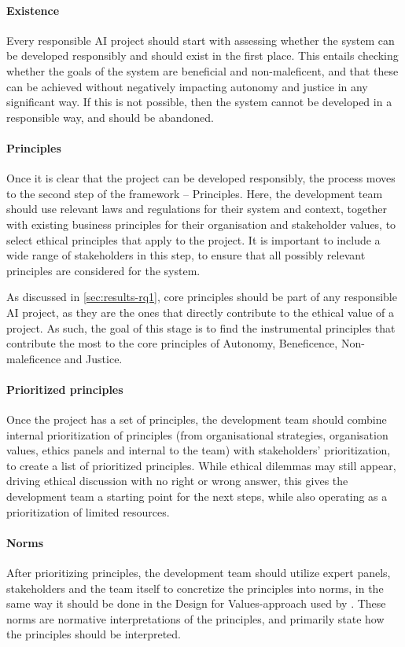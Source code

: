 \paragraph{Existence}
Every responsible AI project should start with assessing whether the system can be developed responsibly and should exist in the first place. This entails checking whether the goals of the system are beneficial and non-maleficent, and that these can be achieved without negatively impacting autonomy and justice in any significant way. If this is not possible, then the system cannot be developed in a responsible way, and should be abandoned.

\paragraph{Principles}
Once it is clear that the project can be developed responsibly, the process moves to the second step of the framework -- Principles. Here, the development team should use relevant laws and regulations for their system and context, together with existing business principles for their organisation and stakeholder values, to select ethical principles that apply to the project. It is important to include a wide range of stakeholders in this step, to ensure that all possibly relevant principles are considered for the system.

As discussed in \autoref{sec:results-rq1}, core principles should be part of any responsible AI project, as they are the ones that directly contribute to the ethical value of a project. As such, the goal of this stage is to find the instrumental principles that contribute the most to the core principles of Autonomy, Beneficence, Non-maleficence and Justice.

\paragraph{Prioritized principles}
Once the project has a set of principles, the development team should combine internal prioritization of principles (from organisational strategies, organisation values, ethics panels and internal to the team) with stakeholders' prioritization, to create a list of prioritized principles. While ethical dilemmas may still appear, driving ethical discussion with no right or wrong answer, this gives the development team a starting point for the next steps, while also operating as a prioritization of limited resources.

\paragraph{Norms}
After prioritizing principles, the development team should utilize expert panels, stakeholders and the team itself to concretize the principles into norms, in the same way it should be done in the Design for Values-approach used by \textcite{Dignum_2019}. These norms are normative interpretations of the principles, and primarily state how the principles should be interpreted.

